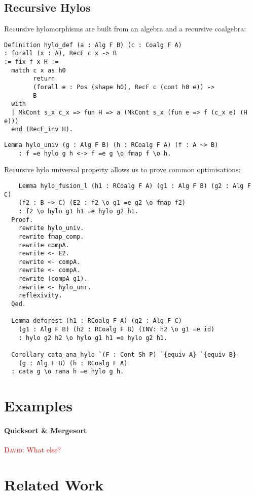 \documentclass[a4paper, UKenglish, cleveref, autoref, thm-restate]{lipics-v2021}
\newcommand{\dcas}[1]{\textcolor{red}{\textsc{David}: #1}}
\begin{document}
\subsection{Recursive Hylos}

Recursive hylomorphisms are built from an algebra and a recursive coalgebra:
\begin{verbatim}
Definition hylo_def (a : Alg F B) (c : Coalg F A)
: forall (x : A), RecF c x -> B
:= fix f x H :=
  match c x as h0
        return
        (forall e : Pos (shape h0), RecF c (cont h0 e)) ->
        B
  with
  | MkCont s_x c_x => fun H => a (MkCont s_x (fun e => f (c_x e) (H e)))
  end (RecF_inv H).
\end{verbatim}

\begin{verbatim}
Lemma hylo_univ (g : Alg F B) (h : RCoalg F A) (f : A ~> B)
    : f =e hylo g h <-> f =e g \o fmap f \o h.
\end{verbatim}

Recursive hylo universal property allows us to prove common optimisations:

\begin{verbatim}
    Lemma hylo_fusion_l (h1 : RCoalg F A) (g1 : Alg F B) (g2 : Alg F C)
    (f2 : B ~> C) (E2 : f2 \o g1 =e g2 \o fmap f2)
    : f2 \o hylo g1 h1 =e hylo g2 h1.
  Proof.
    rewrite hylo_univ.
    rewrite fmap_comp.
    rewrite compA.
    rewrite <- E2.
    rewrite <- compA.
    rewrite <- compA.
    rewrite (compA g1).
    rewrite <- hylo_unr.
    reflexivity.
  Qed.

  Lemma deforest (h1 : RCoalg F A) (g2 : Alg F C)
    (g1 : Alg F B) (h2 : RCoalg F B) (INV: h2 \o g1 =e id)
    : hylo g2 h2 \o hylo g1 h1 =e hylo g2 h1.

  Corollary cata_ana_hylo `(F : Cont Sh P) `{equiv A} `{equiv B}
    (g : Alg F B) (h : RCoalg F A)
  : cata g \o rana h =e hylo g h.
\end{verbatim}

\section{Examples}

\paragraph{Quicksort \& Mergesort}

\dcas{What else?}


\section{Related Work}
\end{document}
